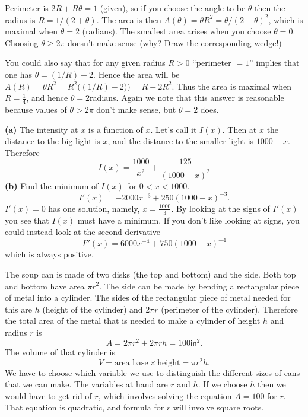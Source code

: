 \item[{\bfseries(V14.2)}]
Perimeter is $2R+R\theta = 1$ (given), so if you choose the angle to
be $\theta$ then the radius is $R=1/(2+\theta)$.  The area is then
$A(\theta) = \theta R^2 = \theta/(2+\theta)^2$, which is maximal when
$\theta=2$ (radians).  The smallest area arises when you choose
$\theta=0$.  Choosing $\theta\ge 2\pi$ doesn't make sense (why?  Draw
the corresponding wedge!)




You could also say that for any given radius $R>0$ ``perimeter
$=1$'' implies that one has $\theta = (1/R)-2$.  Hence the area
will be $A(R) =\theta R^2 = R^2\bigl( (1/R)-2 )\bigr) = R-2R^2$.
Thus the area is maximal when $R=\frac14$, and hence
$\theta=2$radians.  Again we note that this answer is reasonable
because values of $\theta>2\pi$ don't make sense, but $\theta=2$
does.
\bigskip

\item[{\bfseries(V14.3b)}]
\textbf{(a)} The intensity at $x$ is a function of $x$.  Let's
call it $I(x)$.  Then at $x$ the distance to the big light is
$x$, and the distance to the smaller light is $1000-x$. Therefore
\[
  I(x) = \frac{1000}{x^2} + \frac{125}{(1000-x)^2}
\]
\textbf{(b)} Find the minimum of $I(x)$ for $0<x<1000$.
\[
  I'(x) = -2000 x^{-3} + 250(1000 - x)^{-3}.
\]
$I'(x) = 0$ has one solution, namely, $x= \frac{1000}{3}$.
By looking at the signs of $I'(x)$ you see that $I(x)$ must have a
minimum.  If you don't like looking at signs, you could instead
look at the second derivative
\[
  I''(x) = 6000 x^{-4} + 750 (1000 - x)^{-4}
\]
which is always positive.
\bigskip

\item[{\bfseries(V14.4a)}]
The soup can is made of two disks (the top and bottom) and the side.
Both top and bottom have area $\pi r^2$.
The side can be made by bending a rectangular piece of metal into
a cylinder.  The sides of the rectangular piece of metal needed for
this are $h$ (height of the cylinder) and $2\pi r$ (perimeter of
the cylinder).  Therefore the total area of the metal that is needed
to make a cylinder of height $h$ and radius $r$ is
\[
A = 2\pi r^2 + 2\pi rh = 100 \mathsf{in}^2.
\]
The volume of that cylinder is
\[
V = \text{area base} \times \text{height} = \pi r^2h.
\]
We have to choose which variable we use to distinguish the different
sizes of cans that we can make.  The variables at hand are $r$
and $h$.  If we choose $h$ then we would have to get rid of $r$,
which involves solving the equation $A=100$ for $r$.  That equation
is quadratic, and formula for $r$ will involve square roots.




